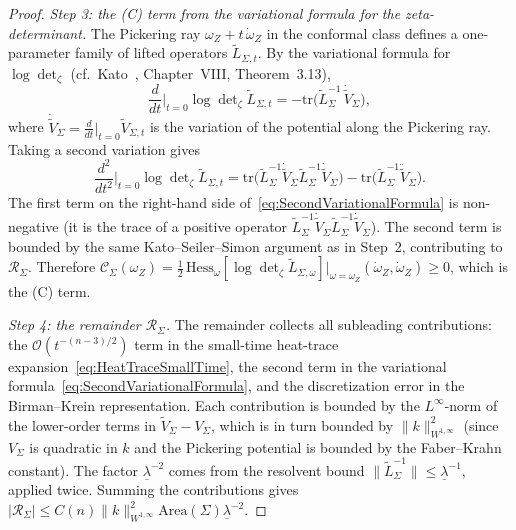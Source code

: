 \begin{proof}
\smallskip
\emph{Step 3: the (C) term from the variational formula for the zeta-determinant.}
The Pickering ray $\omega_Z+t\,\dot\omega_Z$ in the conformal class defines a one-parameter family of lifted operators $\tilde L_{\Sigma,t}$. By the variational formula for $\log\det\nolimits_\zeta$ (cf.\ Kato~\cite{kato1995}, Chapter~VIII, Theorem~3.13),
\begin{equation}\label{eq:VariationalFormula}
    \frac{d}{dt}\bigg|_{t=0}\log\det\nolimits_\zeta \tilde L_{\Sigma,t}
    =
    -\mathrm{tr}\bigl(\tilde L_\Sigma^{-1}\,\dot{\tilde V}_\Sigma\bigr),
\end{equation}
where $\dot{\tilde V}_\Sigma=\tfrac{d}{dt}|_{t=0}\tilde V_{\Sigma,t}$ is the variation of the potential along the Pickering ray. Taking a second variation gives
\begin{equation}\label{eq:SecondVariationalFormula}
    \frac{d^2}{dt^2}\bigg|_{t=0}\log\det\nolimits_\zeta \tilde L_{\Sigma,t}
    =
    \mathrm{tr}\bigl(\tilde L_\Sigma^{-1}\dot{\tilde V}_\Sigma\tilde L_\Sigma^{-1}\dot{\tilde V}_\Sigma\bigr)
    -
    \mathrm{tr}\bigl(\tilde L_\Sigma^{-1}\ddot{\tilde V}_\Sigma\bigr).
\end{equation}
The first term on the right-hand side of~\eqref{eq:SecondVariationalFormula} is non-negative (it is the trace of a positive operator $\tilde L_\Sigma^{-1}\dot{\tilde V}_\Sigma\tilde L_\Sigma^{-1}\dot{\tilde V}_\Sigma$). The second term is bounded by the same Kato--Seiler--Simon argument as in Step~2, contributing to $\mathcal R_\Sigma$. Therefore $\mathcal C_\Sigma(\omega_Z)=\tfrac12\,\mathrm{Hess}_{\omega}[\log\det\nolimits_\zeta\tilde L_{\Sigma,\omega}]|_{\omega=\omega_Z}(\dot\omega_Z,\dot\omega_Z)\ge0$, which is the (C) term.

\smallskip
\emph{Step 4: the remainder $\mathcal R_\Sigma$.}
The remainder collects all subleading contributions: the $\mathcal O(t^{-(n-3)/2})$ term in the small-time heat-trace expansion~\eqref{eq:HeatTraceSmallTime}, the second term in the variational formula~\eqref{eq:SecondVariationalFormula}, and the discretization error in the Birman--Krein representation. Each contribution is bounded by the $L^\infty$-norm of the lower-order terms in $\tilde V_\Sigma-V_\Sigma$, which is in turn bounded by $\|k\|_{W^{1,\infty}}^2$ (since $V_\Sigma$ is quadratic in $k$ and the Pickering potential is bounded by the Faber--Krahn constant). The factor $\underline\lambda^{-2}$ comes from the resolvent bound $\|\tilde L_\Sigma^{-1}\|\le\underline\lambda^{-1}$, applied twice. Summing the contributions gives $|\mathcal R_\Sigma|\le C(n)\|k\|_{W^{1,\infty}}^2\mathrm{Area}(\Sigma)\underline\lambda^{-2}$.


\end{proof}

